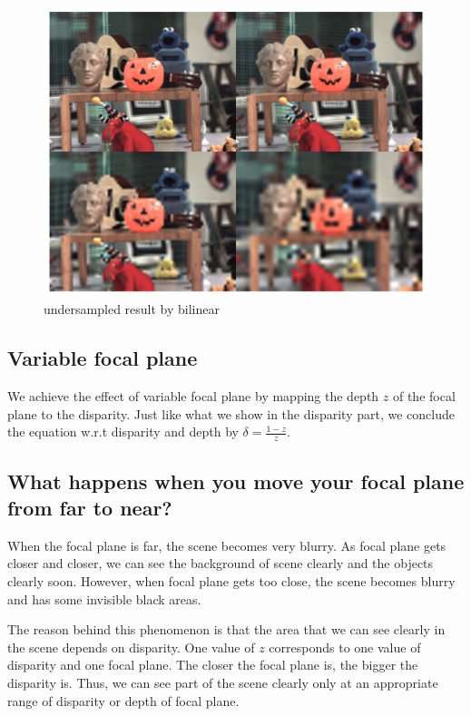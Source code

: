 \documentclass[acmtog]{acmart}
\begin{document}
	\begin{figure}[htbp]
		\centering
		\includegraphics[scale=0.15]{undersampled.png}
		\caption{undersampled result by bilinear}
		\label{fig:Fig6}
	\end{figure}

	\subsection{Variable focal plane}
	\quad We achieve the effect of variable focal plane by mapping the depth $z$ of the focal plane to the disparity. Just like what we show in the disparity part, we conclude the equation w.r.t disparity and depth by $\delta=\frac{1-z}{z}$.
	
	\subsection*{What happens when you move your focal plane from far to near?}
		\quad When the focal plane is far, the scene becomes very blurry. As focal plane gets closer and closer, we can see the background of scene clearly and the objects clearly soon. However, when focal plane gets too close, the scene becomes blurry and has some invisible black areas. 
		
		\quad The reason behind this phenomenon is that the area that we can see clearly in the scene depends on disparity. One value of $z$ corresponds to one value of disparity and one focal plane. The closer the focal plane is, the bigger the disparity is. Thus, we can see part of the scene clearly only at an appropriate range of disparity or depth of focal plane.
		
\end{document}
